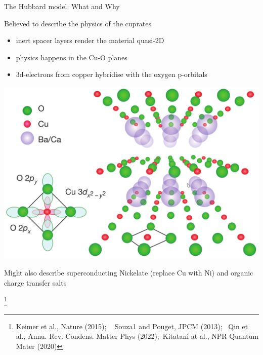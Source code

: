 \documentclass[9pt,aspectratio=169]{beamer}
\begin{document}
\begin{frame}{The Hubbard model: What and Why}

\begin{minipage}{0.59\textwidth}
	\alert{Believed to describe the physics of the cuprates}\\[10pt]

\begin{itemize}
	\item inert spacer layers render the material quasi-2D
	\item physics happens in the Cu-O planes
	\item 3d-electrons from copper hybridise with the oxygen p-orbitals
\end{itemize}
\end{minipage}
\begin{minipage}{0.4\textwidth}
	\includegraphics[width=\textwidth]{cuprates.png}
\end{minipage}

\vspace*{\fill}

Might also describe superconducting Nickelate (replace Cu with Ni) and organic charge transfer salts

\footnote{Keimer et al., Nature (2015); ~ Souza1 and Pouget, JPCM (2013);~ Qin et al., Annu. Rev. Condens. Matter Phys (2022);~Kitatani at al., NPR Quantum Mater (2020)}

\end{frame}
\end{document}
